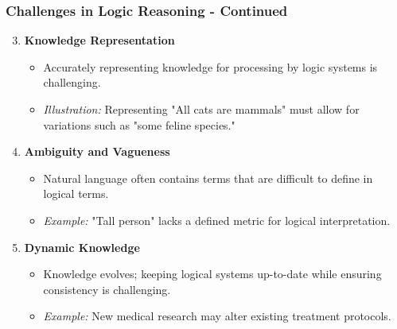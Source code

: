 \documentclass[aspectratio=169]{beamer}
\begin{document}
\begin{frame}[fragile]
    \frametitle{Challenges in Logic Reasoning - Continued}
    \begin{enumerate}
        \setcounter{enumi}{2} %
        \item \textbf{Knowledge Representation}
            \begin{itemize}
                \item Accurately representing knowledge for processing by logic systems is challenging.
                \item \textit{Illustration:} Representing "All cats are mammals" must allow for variations such as "some feline species."
            \end{itemize}

        \item \textbf{Ambiguity and Vagueness}
            \begin{itemize}
                \item Natural language often contains terms that are difficult to define in logical terms.
                \item \textit{Example:} "Tall person" lacks a defined metric for logical interpretation.
            \end{itemize}

        \item \textbf{Dynamic Knowledge}
            \begin{itemize}
                \item Knowledge evolves; keeping logical systems up-to-date while ensuring consistency is challenging.
                \item \textit{Example:} New medical research may alter existing treatment protocols.
            \end{itemize}
    \end{enumerate}
\end{frame}
\end{document}

